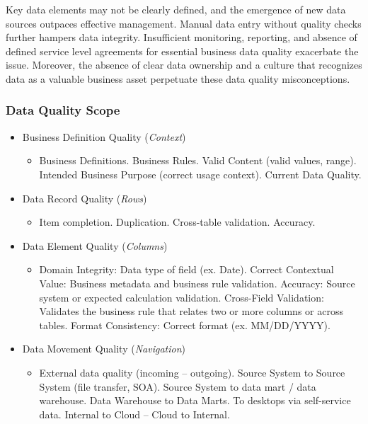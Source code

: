 Key data elements may not be clearly defined, and the emergence of new data sources outpaces effective management. Manual data entry without quality checks further hampers data integrity. Insufficient monitoring, reporting, and absence of defined service level agreements for essential business data quality exacerbate the issue. Moreover, the absence of clear data ownership and a culture that recognizes data as a valuable business asset perpetuate these data quality misconceptions.

\subsubsection{Data Quality Scope}
\begin{itemize}
    \item Business Definition Quality (\textit{Context})
    \begin{itemize}
        \item Business Definitions. Business Rules. Valid Content (valid values, range). Intended Business Purpose (correct usage context). Current Data Quality.
    \end{itemize}
    \item Data Record Quality (\textit{Rows})
    \begin{itemize}
        \item Item completion. Duplication. Cross-table validation. Accuracy.
    \end{itemize}
        \item Data Element Quality (\textit{Columns})
    \begin{itemize}
        \item Domain Integrity: Data type of field (ex. Date). Correct Contextual Value: Business metadata and business rule validation. Accuracy: Source system or expected calculation validation. Cross-Field Validation: Validates the business rule that relates two or more
        columns or across tables. Format Consistency: Correct format (ex. MM/DD/YYYY).
    \end{itemize}
    \item Data Movement Quality (\textit{Navigation})
    \begin{itemize}
        \item External data quality (incoming – outgoing). Source System to Source System (file transfer, SOA). Source System to data mart / data warehouse. Data Warehouse to Data Marts. To desktops via self-service data. Internal to Cloud – Cloud to Internal. 
    \end{itemize}
\end{itemize}

